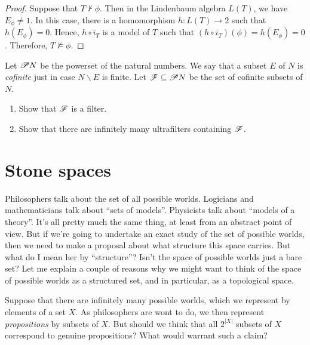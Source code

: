 \begin{proof} Suppose that $T\not\vdash\phi$.  Then in the Lindenbaum
  algebra $L(T)$, we have $E_\phi\neq 1$.  In this case, there is a
  homomorphism $h:L(T)\to 2$ such that $h(E_\phi )=0$.  Hence, $h\circ
  i_T$ is a model of $T$ such that $(h\circ i_T)(\phi )=h(E_\phi )=0$.
  Therefore, $T\not\vDash\phi$.  \end{proof}

\begin{exercise} Let $\mathscr P N$ be the powerset of the natural numbers.
  We say that a subset $E$ of $N$ is \emph{cofinite} just in case
  $N\backslash E$ is finite.  Let $\mathscr F\subseteq \mathscr P N$ be the set of
  cofinite subsets of $N$.
\begin{enumerate}
\item Show that $\mathscr F$ is a filter.
\item Show that there are infinitely many ultrafilters containing
  $\mathscr F$.
\end{enumerate}
\end{exercise}


\section{Stone spaces}

Philosophers talk about the set of all possible worlds.  Logicians and
mathematicians talk about ``sets of models''. Physicists talk about
``models of a theory''.  It's all pretty much the same thing, at least
from an abstract point of view.  But if we're going to undertake an
exact study of the set of possible worlds, then we need to make a
proposal about what structure this space carries.  But what do I mean
her by ``structure''?  Isn't the space of possible worlds just a bare
set?  Let me explain a couple of reasons why we might want to think of
the space of possible worlds as a structured set, and in particular,
as a topological space.

Suppose that there are infinitely many possible worlds, which we
represent by elements of a set $X$.  As philosophers are wont to do,
we then represent \emph{propositions} by subsets of $X$.  But should
we think that all $2^{|X|}$ subsets of $X$ correspond to genuine
propositions?  What would warrant such a claim?

